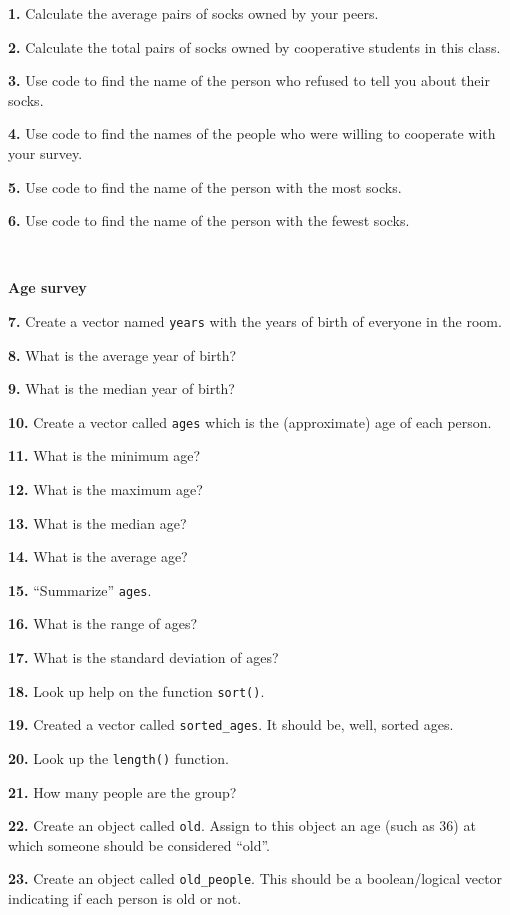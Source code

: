 \documentclass[
]{book}
\begin{document}
\textbf{1.} Calculate the average pairs of socks owned by your peers.

\textbf{2.} Calculate the total pairs of socks owned by cooperative students in this class.

\textbf{3.} Use code to find the name of the person who refused to tell you about their socks.

\textbf{4.} Use code to find the names of the people who were willing to cooperate with your survey.

\textbf{5.} Use code to find the name of the person with the most socks.

\textbf{6.} Use code to find the name of the person with the fewest socks.

~

\textbf{Age survey}

\textbf{7.} Create a vector named \texttt{years} with the years of birth of everyone in the room.

\textbf{8.} What is the average year of birth?

\textbf{9.} What is the median year of birth?

\textbf{10.} Create a vector called \texttt{ages} which is the (approximate) age of each person.

\textbf{11.} What is the minimum age?

\textbf{12.} What is the maximum age?

\textbf{13.} What is the median age?

\textbf{14.} What is the average age?

\textbf{15.} ``Summarize'' \texttt{ages}.

\textbf{16.} What is the range of ages?

\textbf{17.} What is the standard deviation of ages?

\textbf{18.} Look up help on the function \texttt{sort()}.

\textbf{19.} Created a vector called \texttt{sorted\_ages}. It should be, well, sorted ages.

\textbf{20.} Look up the \texttt{length()} function.

\textbf{21.} How many people are the group?

\textbf{22.} Create an object called \texttt{old}. Assign to this object an age (such as 36) at which someone should be considered ``old''.

\textbf{23.} Create an object called \texttt{old\_people}. This should be a boolean/logical vector indicating if each person is old or not.
\end{document}

